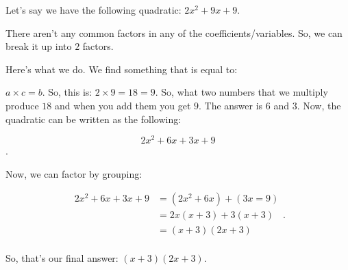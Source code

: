 \label{les_5_unit_3:factor_quadratic_with_lc_greater_than_1}

Let's say we have the following quadratic: $2x^{2} + 9x + 9$.

There aren't any common factors in any of the coefficients/variables.
So, we can break it up into $2$ factors.

Here's what we do. We find something that is equal to:

$a \times c = b$. So, this is: $2 \times 9 = 18 = 9$. So, what two numbers
that we multiply produce $18$ and when you add them you get $9$. The answer
is $6$ and $3$. Now, the quadratic can be written as the following:

\[ 2x^{2} + 6x + 3x + 9 \].

Now, we can factor by grouping:

\begin{equation}
  \label{spt:factor_by_grouping_1}
  \begin{split}
    2x^{2} + 6x + 3x + 9 &= (2x^{2} + 6x) + (3x = 9) \\
                         &= 2x(x + 3) + 3(x + 3) \\
                         &= (x + 3)(2x + 3) \\
  \end{split}
.\end{equation}

So, that's our final answer: $(x + 3)(2x + 3)$.

\newpage
